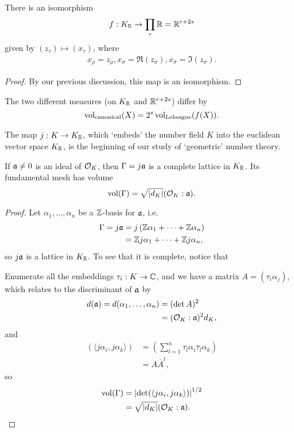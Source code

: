\begin{prop}[Neukirch 5.1]
	There is an isomorphism
	\[
		f : K_{\mathbb{R}} \to \prod_\tau \mathbb{R} = \mathbb{R}^{r+2s}
	\]
	given by $(z_\tau)\mapsto(x_\tau)$, where
	\begin{align*}
		x_\rho = z_\rho, x_\sigma = \Re(z_\sigma), x_{\overline{\sigma}} = \Im(z_\sigma).
	\end{align*}
\end{prop}
\begin{proof}
	By our previous discussion, this map is an isomorphism.
\end{proof}

The two different measures (on $K_{\mathbb{R}}$ and $\mathbb{R}^{r+2s}$) differ by
\[
	\operatorname{vol}_{\text{canonical}}(X) = 2^s\operatorname{vol}_{\text{Lebesgue}}(f(X)).
\]


The map $j:K\to K_{\mathbb{R}}$, which `embeds' the number field $K$ into the euclidean vector space $K_{\mathbb{R}}$, is the beginning of our study of `geometric' number theory.

\begin{prop}[Neukirch 5.2]
	If $\mathfrak{a}\neq 0$ is an ideal of $\mathcal{O}_K$, then $\Gamma=j\mathfrak{a}$ is a complete lattice in $K_{\mathbb{R}}$. Its fundamental mesh has volume
	\[
		\operatorname{vol}(\Gamma) = \sqrt{|d_K|}(\mathcal{O}_K:\mathfrak{a}).
	\]
\end{prop}
\begin{proof}
	Let $\alpha_1,\dots,\alpha_n$ be a $\mathbb{Z}$-basis for $\mathfrak{a}$, i.e.
	\begin{align*}
		\Gamma = j\mathfrak{a} &= j\left(\mathbb{Z}\alpha_1+\cdots+\mathbb{Z}\alpha_n\right)\\
			&= \mathbb{Z} j\alpha_1 + \cdots + \mathbb{Z} j\alpha_n,
	\end{align*}
	so $j\mathfrak{a}$ is a lattice in $K_{\mathbb{R}}$. To see that it is complete, notice that

	Enumerate all the embeddings $\tau_i:K\to\mathbb{C}$, and we have a matrix $A=(\tau_i\alpha_j)$, which relates to the discriminant of $\mathfrak{a}$ by
	\begin{align*}
		d(\mathfrak{a}) = d(\alpha_1,\dots,\alpha_n) &= (\det A)^2\\
			&= (\mathcal{O}_K:\mathfrak{a})^2 d_K,
	\end{align*}
	and
	\begin{align*}
		(\langle j\alpha_i, j\alpha_k\rangle) &= (\sum_{l=1}^n \tau_l\alpha_i \overline{\tau}_l\alpha_k)\\
			&= A\overline{A}^t,
	\end{align*}
	so 
	\begin{align*}
		\operatorname{vol}(\Gamma) &= \left|\det(\langle j\alpha_i,j\alpha_k\rangle)\right|^{1/2}\\
			&= \sqrt{|d_K|}(\mathcal{O}_K:\mathfrak{a}).
	\end{align*}
\end{proof}

